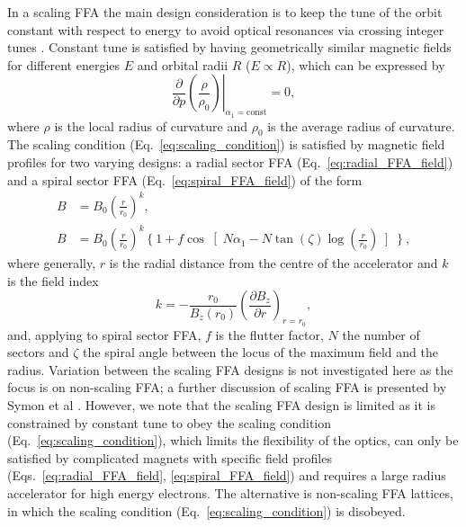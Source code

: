 \documentclass[../main.tex]{subfiles}
\begin{document}
In a scaling FFA the main design consideration is to keep the tune of the orbit constant with respect to energy to avoid optical resonances via crossing integer tunes \cite{symon1956fixed}. Constant tune is satisfied by having geometrically similar magnetic fields for different energies $E$ and orbital radii $R$ ($E\propto R$), which can be expressed by
\begin{equation}
\left.\frac{\partial}{\partial p} \left(\frac{\rho}{\rho_{0}}\right)\right|_{\alpha_{1}=\mathrm{const}}=0,
\label{eq:scaling_condition}    
\end{equation}
where $\rho$ is the local radius of curvature and $\rho_{0}$ is the average radius of curvature. The scaling condition (Eq.~\ref{eq:scaling_condition}) is satisfied by magnetic field profiles for two varying designs: a radial sector FFA (Eq.~\ref{eq:radial_FFA_field}) and a spiral sector FFA (Eq.~\ref{eq:spiral_FFA_field}) of the form \cite{symon1956fixed}
\begin{align}
B &= B_{0}\left(\frac{r}{r_{0}}\right)^{k}, 
\label{eq:radial_FFA_field} \\
B &= B_{0}\left(\frac{r}{r_{0}}\right)^{k}\left\{1+f\cos\right[N\alpha_{1}-N\tan\left(\zeta\right)\log\left(\frac{r}{r_{0}}\right)\left]\right\},
\label{eq:spiral_FFA_field}
\end{align}
where generally, $r$ is the radial distance from the centre of the accelerator and $k$ is the field index
\begin{equation}
k=-\frac{r_{0}}{B_{z}\left(r_{0}\right)}\left(\frac{\partial B_{z}}{\partial r}\right)_{r=r_{0}},
\label{eq:FFAG_field_index}
\end{equation}
and, applying to spiral sector FFA, $f$ is the flutter factor, $N$ the number of sectors and $\zeta$ the spiral angle between the locus of the maximum field and the radius. Variation between the scaling FFA designs is not investigated here as the focus is on non-scaling FFA; a further discussion of scaling FFA is presented by Symon et al \cite{symon1956fixed}. However, we note that the scaling FFA design is limited as it is constrained by constant tune to obey the scaling condition (Eq.~\ref{eq:scaling_condition}), which limits the flexibility of the optics, can only be satisfied by complicated magnets with specific field profiles (Eqs.~\ref{eq:radial_FFA_field}, \ref{eq:spiral_FFA_field}) and requires a large radius accelerator for high energy electrons. The alternative is non-scaling FFA lattices, in which the scaling condition (Eq.~\ref{eq:scaling_condition}) is disobeyed.
\end{document}
